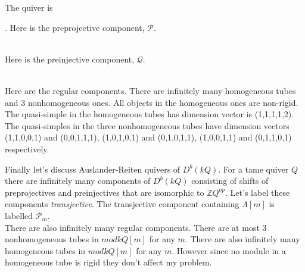 \begin{example}
The quiver is .
\indent Here is the preprojective component, $\mathcal{P}$.\\
\\
Here is the preinjective component, $\mathcal{Q}$.\\
\\
\indent Here are the regular components. There are infinitely many homogeneous tubes and 3 nonhomogeneous ones. All objects in the homogeneous ones are non-rigid. The quasi-simple in the homogeneous tubes has dimension vector is (1,1,1,1,2). The quasi-simples in the three nonhomogeneous tubes have dimension vectors (1,1,0,0,1) and (0,0,1,1,1), (1,0,1,0,1) and (0,1,0,1,1), (1,0,0,1,1) and (0,1,1,0,1) respectively.\\
\end{example}
\indent Finally let's discuss Auslander-Reiten quivers of $D^b(kQ)$. For a tame quiver $Q$ there are infinitely many components of $D^b(kQ)$ consisting of shifts of preprojectives and preinjectives that are isomorphic to $\mathbb{Z}Q^{op}$. Let's label these components \textit{transjective}. The transjective component containing $\Lambda[m]$ is labelled $\mathcal{P}_m$.\\
\indent There are also infinitely many regular components. There are at most 3 nonhomogeneous tubes in $mod kQ[m]$ for any $m$. There are also infinitely many homogeneous tubes in $mod kQ[m]$ for any $m$. However since no module in a homogeneous tube is rigid they don't affect my problem.\\
